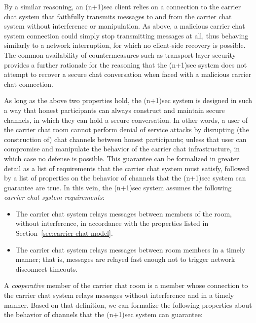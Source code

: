 \documentclass{article}
\begin{document}
By a similar reasoning, an (n+1)sec client relies on a connection to the carrier chat system that faithfully transmits messages to and from the carrier chat system without interference or manipulation.
As above, a malicious carrier chat system connection could simply stop transmitting messages at all, thus behaving similarly to a network interruption, for which no client-side recovery is possible.
The common availability of countermeasures such as transport layer security provides a further rationale for the reasoning that the (n+1)sec system does not attempt to recover a secure chat conversation when faced with a malicious carrier chat connection.

As long as the above two properties hold, the (n+1)sec system is designed in such a way that honest participants can always construct and maintain secure channels, in which they can hold a secure conversation.
In other words, a user of the carrier chat room cannot perform denial of service attacks by disrupting (the construction of) chat channels between honest participants; unless that user can compromise and manipulate the behavior of the carrier chat infrastructure, in which case no defense is possible.
This guarantee can be formalized in greater detail as a list of requirements that the carrier chat system must satisfy, followed by a list of properties on the behavior of channels that the (n+1)sec system can guarantee are true.
In this vein, the (n+1)sec system assumes the following \emph{carrier chat system requirements}:

\begin{itemize}
\item The carrier chat system relays messages between members of the room, without interference, in accordance with the properties listed in Section~\ref{sec:carrier-chat-model}.
\item The carrier chat system relays messages between room members in a timely manner; that is, messages are relayed fast enough not to trigger network disconnect timeouts.
\end{itemize}

A \emph{cooperative} member of the carrier chat room is a member whose connection to the carrier chat system relays messages without interference and in a timely manner.
Based on that definition, we can formalize the following properties about the behavior of channels that the (n+1)sec system can guarantee:
\end{document}
